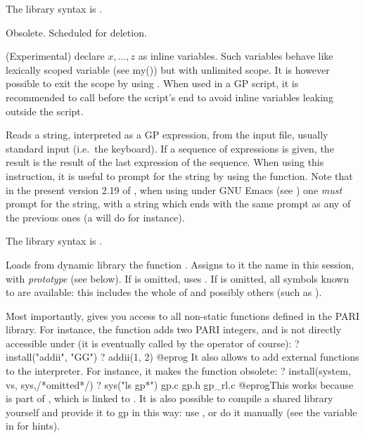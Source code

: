 The library syntax is .

\label{se:global}
Obsolete. Scheduled for deletion.

\label{se:inline}
(Experimental) declare $x,\ldots, z$ as inline variables. Such variables
behave like lexically scoped variable (see my()) but with unlimited scope.
It is however possible to exit the scope by using .
When used in a GP script, it is recommended to call  before
the script's end to avoid inline variables leaking outside the script.

\label{se:input}
Reads a string, interpreted as a GP expression,
from the input file, usually standard input (i.e.~the keyboard). If a
sequence of expressions is given, the result is the result of the last
expression of the sequence. When using this instruction, it is useful to
prompt for the string by using the  function. Note that in the
present version 2.19 of , when using  under GNU Emacs (see
) one \emph{must} prompt for the string, with a string
which ends with the same prompt as any of the previous ones (a 
will do for instance).

The library syntax is .

\label{se:install}
Loads from dynamic library  the function . Assigns to it
the name  in this  session, with \emph{prototype}
 (see below). If  is omitted, uses .
If  is omitted, all symbols known to  are available: this
includes the whole of  and possibly others (such as
).

Most importantly,  gives you access to all non-static functions
defined in the PARI library. For instance, the function  adds two PARI integers, and is not directly accessible under
 (it is eventually called by the \kbd{+} operator of course):
\bprog
? install("addii", "GG")
? addii(1, 2)
@eprog\noindent
It also allows to add external functions to the  interpreter.
For instance, it makes the function  obsolete:
\bprog
? install(system, vs, sys,/*omitted*/)
? sys("ls gp*")
gp.c            gp.h            gp_rl.c
@eprog\noindent This works because  is part of ,
which is linked to . It is also possible to compile a shared library
yourself and provide it to gp in this way: use , or do it manually
(see the  variable in  for hints).


